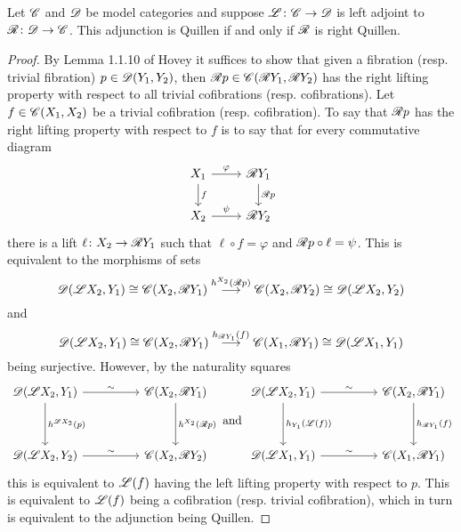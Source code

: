 \documentclass[10pt]{amsart}
\begin{document}

\begin{lem}
  Let $\mathscr{C}$ and $\mathscr{D}$ be model categories and suppose $\mathscr{L} \colon \mathscr{C} \to \mathscr{D}$ is left adjoint to $\mathscr{R} \colon \mathscr{D} \to \mathscr{C}$.
  This adjunction is Quillen if and only if $\mathscr{R}$ is right Quillen.

  \begin{proof}
    By Lemma 1.1.10 of Hovey it suffices to show that given a fibration (resp. trivial fibration) $p \in \mathscr{D}(Y_1, Y_2)$, then $\mathscr{R} p \in \mathscr{C}(\mathscr{R} Y_1, \mathscr{R} Y_2)$ has the right lifting property with respect to all trivial cofibrations (resp. cofibrations).
    Let $f \in \mathscr{C}(X_1, X_2)$ be a trivial cofibration (resp. cofibration).
    To say that $\mathscr{R} p$ has the right lifting property with respect to $f$ is to say that for every commutative diagram
    $$\begin{tikzcd}
      X_1 \arrow{r}{\varphi}\arrow{d}{f} & \RA Y_1\arrow{d}{\RA p}\\
      X_2 \arrow{r}{\psi} & \RA Y_2
    \end{tikzcd}$$
    there is a lift $\ell \colon X_2 \to \mathscr{R} Y_1$ such that $\ell \circ f = \varphi$ and $\mathscr{R} p \circ \ell = \psi$.
    This is equivalent to the morphisms of sets
    $$\mathscr{D}(\mathscr{L} X_2, Y_1) \cong \mathscr{C}(X_2, \mathscr{R} Y_1) \overset{h^{X_2}(\mathscr{R} p)}\longrightarrow \mathscr{C}(X_2, \mathscr{R} Y_2) \cong \mathscr{D}(\mathscr{L} X_2, Y_2)$$
    and
    $$\mathscr{D}(\mathscr{L} X_2,Y_1) \cong \mathscr{C}(X_2, \mathscr{R} Y_1) \overset{h_{\mathscr{R} Y_1}(f)}\longrightarrow \mathscr{C}(X_1, \mathscr{R} Y_1) \cong \mathscr{D}(\mathscr{L} X_1, Y_1)$$
    being surjective.
    However, by the naturality squares
    $$\begin{tikzcd}
      \D(\LA X_2, Y_1) \arrow{rr}{\sim} \arrow{dd}{h^{\LA X_2}(p)} && \C(X_2, \RA Y_1)\arrow{dd}{h^{X_2}(\RA p)}\\
      \\
      \D(\LA X_2, Y_2) \arrow{rr}{\sim} && \C(X_2, \RA Y_2)
    \end{tikzcd}
    \ \text{and}\ 
    \begin{tikzcd}
      \D(\LA X_2, Y_1) \arrow{rr}{\sim}\arrow{dd}{h_{Y_1}(\LA(f))} && \C(X_2, \RA Y_1)\arrow{dd}{h_{\RA Y_1}(f)}\\
      \\
      \D(\LA X_1, Y_1) \arrow{rr}{\sim} && \C(X_1, \RA Y_1)
    \end{tikzcd}$$
    this is equivalent to $\mathscr{L}(f)$ having the left lifting property with respect to $p$.
    This is equivalent to $\mathscr{L}(f)$ being a cofibration (resp. trivial cofibration), which in turn is equivalent to the adjunction being Quillen.
  \end{proof}
\end{lem}
\end{document}
